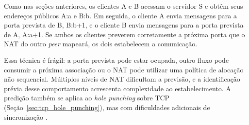 Como nas seções anteriores, os clientes A e B acessam o servidor S e obtêm seus endereços públicos A:a e B:b. Em seguida, o cliente A envia mensagens para a porta prevista de B, B:b+1, e o cliente B envia mensagens para a porta prevista de A, A:a+1. Se ambos os clientes preverem corretamente a próxima porta que o NAT do outro \textit{peer} mapeará, os dois estabelecem a comunicação.

Essa técnica é frágil: a porta prevista pode estar ocupada, outro fluxo pode consumir a próxima associação ou o NAT pode utilizar uma política de alocação não sequencial. Múltiplos níveis de NAT dificultam a previsão, e a identificação prévia desse comportamento acrescenta complexidade ao estabelecimento. A predição também se aplica ao \textit{hole punching} sobre TCP (Seção~\ref{sec:tcp_hole_punching}), mas com dificuldades adicionais de sincronização \citep{rfc5128}.

